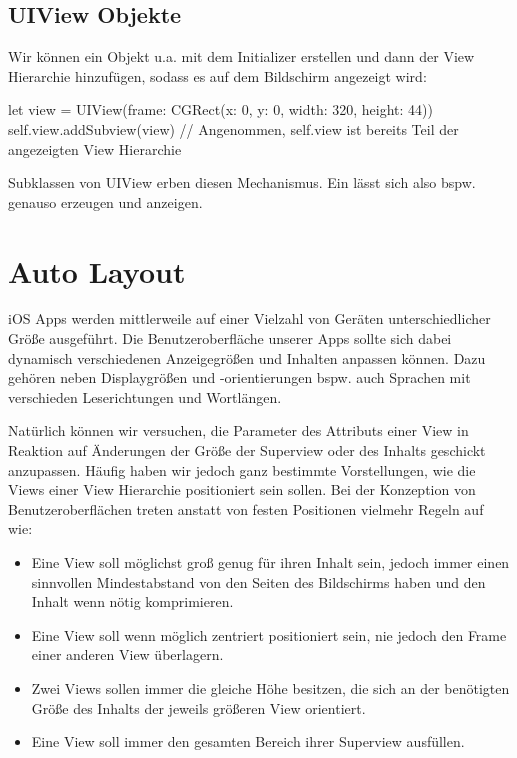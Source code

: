 \documentclass[parskip=half, final]{scrreprt}
\begin{document}
\subsection{UIView Objekte}

Wir können ein  Objekt u.a. mit dem Initializer  erstellen und dann der View Hierarchie hinzufügen, sodass es auf dem Bildschirm angezeigt wird:
\begin{swiftcode}
let view = UIView(frame: CGRect(x: 0, y: 0, width: 320, height: 44))
self.view.addSubview(view) // Angenommen, self.view ist bereits Teil der angezeigten View Hierarchie
\end{swiftcode}

Subklassen von UIView erben diesen Mechanismus. Ein  lässt sich also bspw. genauso erzeugen und anzeigen.


\section{Auto Layout}

\mvcindicatorview

iOS Apps werden mittlerweile auf einer Vielzahl von Geräten unterschiedlicher Größe ausgeführt. Die Benutzeroberfläche unserer Apps sollte sich dabei dynamisch verschiedenen Anzeigegrößen und Inhalten anpassen können. Dazu gehören neben Displaygrößen und -orientierungen bspw. auch Sprachen mit verschieden Leserichtungen und Wortlängen. %


Natürlich können wir versuchen, die Parameter des  Attributs einer View in Reaktion auf Änderungen der Größe der Superview oder des Inhalts geschickt anzupassen. Häufig haben wir jedoch ganz bestimmte Vorstellungen, wie die Views einer View Hierarchie  positioniert sein sollen. Bei der Konzeption von Benutzeroberflächen treten anstatt von festen Positionen vielmehr Regeln auf wie:
\begin{itemize}
\item Eine View soll möglichst groß genug für ihren Inhalt sein, jedoch immer einen sinnvollen Mindestabstand von den Seiten des Bildschirms haben und den Inhalt wenn nötig komprimieren.
\item Eine View soll wenn möglich zentriert positioniert sein, nie jedoch den Frame einer anderen View überlagern.
\item Zwei Views sollen immer die gleiche Höhe besitzen, die sich an der benötigten Größe des Inhalts der jeweils größeren View orientiert.
\item Eine View soll immer den gesamten Bereich ihrer Superview ausfüllen.
\end{itemize}
\end{document}
